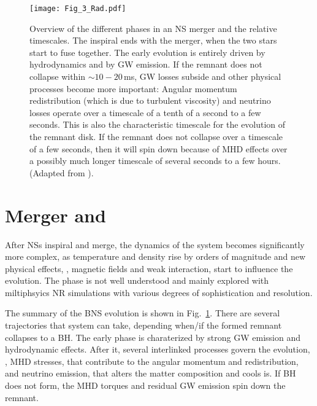 \begin{figure}[t]
    \centering
    \texttt{[image: Fig\_3\_Rad.pdf]}
    \caption{
        Overview of the different phases in an \ac{NS} merger and the relative timescales. 
        The inspiral ends with the merger, when the two stars start to fuse together. 
        The early \pmerg{} evolution is entirely driven by hydrodynamics and by \ac{GW} emission. 
        If the remnant does not collapse within ${\sim}10-20\,$ms, \ac{GW} losses
        subside and other physical processes become more important: 
        Angular momentum redistribution (which is due to turbulent viscosity) 
        and neutrino losses operate over a timescale of a tenth of a second to a few
        seconds. This is also the characteristic timescale for the evolution of the remnant disk. 
        If the remnant does not collapse over a timescale of a few seconds, then it will 
        spin down because of \ac{MHD} effects over a possibly much longer timescale 
        of several seconds to a few hours. 
        (Adapted from \citet{Radice:2020ddv}).
    }
    \label{fig:intro:RadFig1}
\end{figure}


\section{Merger and \pmerg{}}\label{sec:intro:merg_pmerg} %

After \acp{NS} inspiral and merge, the dynamics of the system becomes significantly 
more complex, as temperature and density rise by orders of magnitude and new 
physical effects, \eg, magnetic fields and weak interaction, start to influence the evolution. 
The \pmerg{} phase is not well understood and mainly explored with miltiphsyics \ac{NR} 
simulations with various degrees of sophistication and resolution. 

The summary of the \ac{BNS} \pmerg{} evolution is shown in Fig.~\ref{fig:intro:RadFig1}. 
There are several trajectories that system can take, depending when/if the formed remnant 
collapses to a \ac{BH}. The early \pmerg{} phase is charaterized by strong \ac{GW} 
emission and hydrodynamic effects. After it, several interlinked processes govern the 
evolution, \eg, \ac{MHD} stresses, that contribute to the angular momentum and redistribution, 
and neutrino emission, that alters the matter composition and cools is.
If \ac{BH} does not form, the \ac{MHD} torques and residual \ac{GW} emission spin down 
the remnant.

